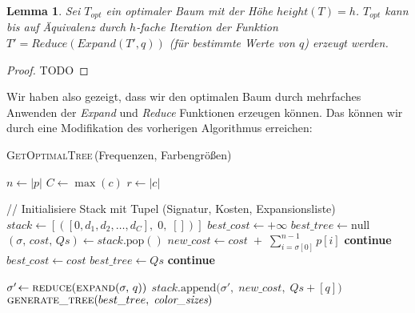 \documentclass[a4paper,10pt,ngerman]{scrartcl}
\newtheorem{lemma}[satz]{Lemma}
\begin{document}
    \begin{lemma}
        Sei $T_{opt}$ ein optimaler Baum mit der Höhe $height(T) = h$. $T_{opt}$ kann bis auf Äquivalenz durch $h$-fache Iteration der Funktion $T' = Reduce(Expand(T',q))$ (für bestimmte Werte von $q$) erzeugt werden. %
    \end{lemma}
    \begin{proof}
        TODO
    \end{proof}
    Wir haben also gezeigt, dass wir den optimalen Baum durch mehrfaches Anwenden der \textit{Expand} und \textit{Reduce} Funktionen erzeugen können.
    Das können wir durch eine Modifikation des vorherigen Algorithmus erreichen:
    \begin{algorithm} [H]
        \caption{\textsc{GetOptimalTree}\,(Frequenzen, Farbengrößen)}
        \begin{algorithmic}[1]
                \State $n \gets |p|$  
                \State $C \gets \max(c)$ 
                \State $r \gets |c|$  

                \State // Initialisiere Stack mit Tupel (Signatur, Kosten, Expansionsliste)
                \State $stack \gets [([0, d_1, d_2, \dots, d_C],\;0,\;[])]$
                \State $best\_cost \gets +\infty$
                \State $best\_tree \gets \text{null}$
                    \State $(\sigma,\,cost,\,Qs) \gets stack.\mathrm{pop}()$
                    \State $new\_cost \gets cost \;+\;\sum_{i=\sigma[0]}^{n-1} p[i]$
                        \State \textbf{continue}
                    \EndIf
                            \State $best\_cost \gets cost$
                            \State $best\_tree \gets Qs$
                        \EndIf
                        \State \textbf{continue}
                    \EndIf

                        \State $\sigma'\!\gets \textsc{reduce}(\textsc{expand}(\sigma,\,q))$
                        \State $stack.\mathrm{append}\bigl(\sigma',\;new\_cost,\;Qs + [q]\bigr)$
                    \EndFor
                \EndWhile
                \State \Return $\textsc{generate\_tree}(best\_tree,\;\textit{color\_sizes})$
            \EndFunction
        \end{algorithmic}\label{alg:algorithm}
    \end{algorithm}
\end{document}
